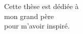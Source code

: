 \begin{dedication}
Cette thèse est dédiée à\\
mon grand père\\
pour m'avoir inspiré.\\
\end{dedication}